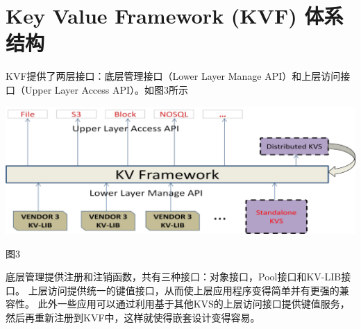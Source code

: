 \section{Key Value Framework (KVF) 体系结构}\label{sec:KVF-Architecture}
	KVF提供了两层接口：底层管理接口（Lower Layer Manage API）和上层访问接口（Upper Layer Access API）。如图3所示
	\begin{center}
		\includegraphics[width=13.9cm]{img/figure3.pdf}
	\end{center}
	\centerline {图3}
	底层管理提供注册和注销函数，共有三种接口：对象接口，Pool接口和KV-LIB接口。
	上层访问提供统一的键值接口，从而使上层应用程序变得简单并有更强的兼容性。
	此外一些应用可以通过利用基于其他KVS的上层访问接口提供键值服务，然后再重新注册到KVF中，这样就使得嵌套设计变得容易。




